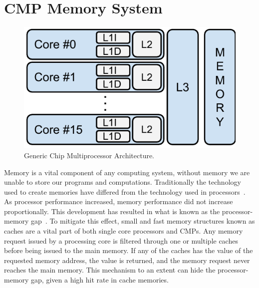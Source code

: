 \section{CMP Memory System}

\begin{figure}[ht]
\centering
\includegraphics[scale=.65]{figures/processor_model/processor_model}
\caption{Generic Chip Multiprocessor Architecture.}
\label{fig:cmp_model}
\end{figure}

Memory is a vital component of any computing system, without memory we are unable to store our programs and computations.
Traditionally the technology used to create memories have differed from the technology used in processors~\cite{Wilkes2001}.
As processor performance increased, memory performance did not increase proportionally.
This development has resulted in what is known as the processor-memory gap~\cite{Wilkes2001}.
To mitigate this effect, small and fast memory structures known as caches are a vital part of both single core processors and CMPs.
Any memory request issued by a processing core is filtered through one or multiple caches before being issued to the main memory.
If any of the caches has the value of the requested memory address, the value is returned, and the memory request never reaches the main memory.
This mechanism to an extent can hide the processor-memory gap, given a high hit rate in cache memories.

